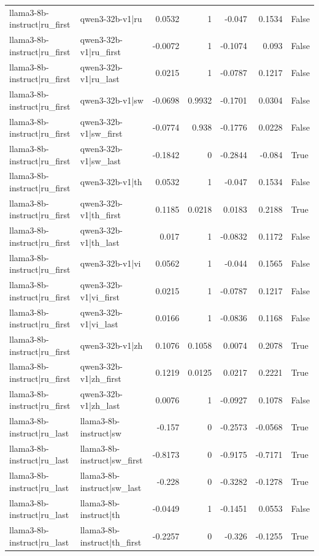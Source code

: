\begin{table}
\begin{tabular}{l l r r r r l}
llama3-8b-instruct|ru_first & qwen3-32b-v1|ru & 0.0532 & 1 & -0.047 & 0.1534 & False \\
llama3-8b-instruct|ru_first & qwen3-32b-v1|ru_first & -0.0072 & 1 & -0.1074 & 0.093 & False \\
llama3-8b-instruct|ru_first & qwen3-32b-v1|ru_last & 0.0215 & 1 & -0.0787 & 0.1217 & False \\
llama3-8b-instruct|ru_first & qwen3-32b-v1|sw & -0.0698 & 0.9932 & -0.1701 & 0.0304 & False \\
llama3-8b-instruct|ru_first & qwen3-32b-v1|sw_first & -0.0774 & 0.938 & -0.1776 & 0.0228 & False \\
llama3-8b-instruct|ru_first & qwen3-32b-v1|sw_last & -0.1842 & 0 & -0.2844 & -0.084 & True \\
llama3-8b-instruct|ru_first & qwen3-32b-v1|th & 0.0532 & 1 & -0.047 & 0.1534 & False \\
llama3-8b-instruct|ru_first & qwen3-32b-v1|th_first & 0.1185 & 0.0218 & 0.0183 & 0.2188 & True \\
llama3-8b-instruct|ru_first & qwen3-32b-v1|th_last & 0.017 & 1 & -0.0832 & 0.1172 & False \\
llama3-8b-instruct|ru_first & qwen3-32b-v1|vi & 0.0562 & 1 & -0.044 & 0.1565 & False \\
llama3-8b-instruct|ru_first & qwen3-32b-v1|vi_first & 0.0215 & 1 & -0.0787 & 0.1217 & False \\
llama3-8b-instruct|ru_first & qwen3-32b-v1|vi_last & 0.0166 & 1 & -0.0836 & 0.1168 & False \\
llama3-8b-instruct|ru_first & qwen3-32b-v1|zh & 0.1076 & 0.1058 & 0.0074 & 0.2078 & True \\
llama3-8b-instruct|ru_first & qwen3-32b-v1|zh_first & 0.1219 & 0.0125 & 0.0217 & 0.2221 & True \\
llama3-8b-instruct|ru_first & qwen3-32b-v1|zh_last & 0.0076 & 1 & -0.0927 & 0.1078 & False \\
llama3-8b-instruct|ru_last & llama3-8b-instruct|sw & -0.157 & 0 & -0.2573 & -0.0568 & True \\
llama3-8b-instruct|ru_last & llama3-8b-instruct|sw_first & -0.8173 & 0 & -0.9175 & -0.7171 & True \\
llama3-8b-instruct|ru_last & llama3-8b-instruct|sw_last & -0.228 & 0 & -0.3282 & -0.1278 & True \\
llama3-8b-instruct|ru_last & llama3-8b-instruct|th & -0.0449 & 1 & -0.1451 & 0.0553 & False \\
llama3-8b-instruct|ru_last & llama3-8b-instruct|th_first & -0.2257 & 0 & -0.326 & -0.1255 & True \\

\end{tabular}
\end{table}
